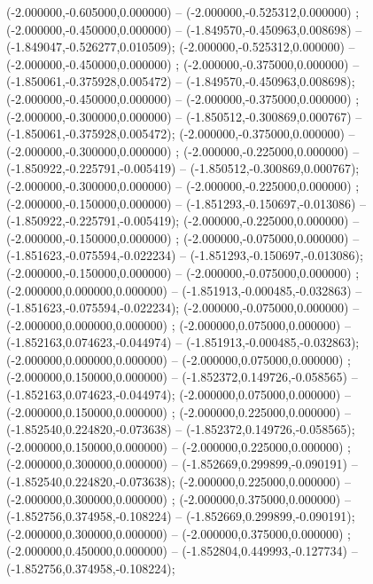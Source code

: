  (-2.000000,-0.605000,0.000000) -- (-2.000000,-0.525312,0.000000) ;
 (-2.000000,-0.450000,0.000000) -- (-1.849570,-0.450963,0.008698) -- (-1.849047,-0.526277,0.010509);
 (-2.000000,-0.525312,0.000000) -- (-2.000000,-0.450000,0.000000) ;
 (-2.000000,-0.375000,0.000000) -- (-1.850061,-0.375928,0.005472) -- (-1.849570,-0.450963,0.008698);
 (-2.000000,-0.450000,0.000000) -- (-2.000000,-0.375000,0.000000) ;
 (-2.000000,-0.300000,0.000000) -- (-1.850512,-0.300869,0.000767) -- (-1.850061,-0.375928,0.005472);
 (-2.000000,-0.375000,0.000000) -- (-2.000000,-0.300000,0.000000) ;
 (-2.000000,-0.225000,0.000000) -- (-1.850922,-0.225791,-0.005419) -- (-1.850512,-0.300869,0.000767);
 (-2.000000,-0.300000,0.000000) -- (-2.000000,-0.225000,0.000000) ;
 (-2.000000,-0.150000,0.000000) -- (-1.851293,-0.150697,-0.013086) -- (-1.850922,-0.225791,-0.005419);
 (-2.000000,-0.225000,0.000000) -- (-2.000000,-0.150000,0.000000) ;
 (-2.000000,-0.075000,0.000000) -- (-1.851623,-0.075594,-0.022234) -- (-1.851293,-0.150697,-0.013086);
 (-2.000000,-0.150000,0.000000) -- (-2.000000,-0.075000,0.000000) ;
 (-2.000000,0.000000,0.000000) -- (-1.851913,-0.000485,-0.032863) -- (-1.851623,-0.075594,-0.022234);
 (-2.000000,-0.075000,0.000000) -- (-2.000000,0.000000,0.000000) ;
 (-2.000000,0.075000,0.000000) -- (-1.852163,0.074623,-0.044974) -- (-1.851913,-0.000485,-0.032863);
 (-2.000000,0.000000,0.000000) -- (-2.000000,0.075000,0.000000) ;
 (-2.000000,0.150000,0.000000) -- (-1.852372,0.149726,-0.058565) -- (-1.852163,0.074623,-0.044974);
 (-2.000000,0.075000,0.000000) -- (-2.000000,0.150000,0.000000) ;
 (-2.000000,0.225000,0.000000) -- (-1.852540,0.224820,-0.073638) -- (-1.852372,0.149726,-0.058565);
 (-2.000000,0.150000,0.000000) -- (-2.000000,0.225000,0.000000) ;
 (-2.000000,0.300000,0.000000) -- (-1.852669,0.299899,-0.090191) -- (-1.852540,0.224820,-0.073638);
 (-2.000000,0.225000,0.000000) -- (-2.000000,0.300000,0.000000) ;
 (-2.000000,0.375000,0.000000) -- (-1.852756,0.374958,-0.108224) -- (-1.852669,0.299899,-0.090191);
 (-2.000000,0.300000,0.000000) -- (-2.000000,0.375000,0.000000) ;
 (-2.000000,0.450000,0.000000) -- (-1.852804,0.449993,-0.127734) -- (-1.852756,0.374958,-0.108224);
